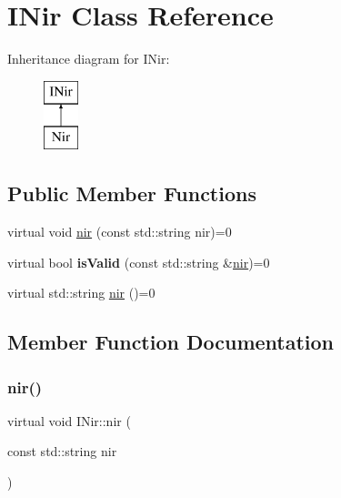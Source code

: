 \hypertarget{class_i_nir}{}\section{I\+Nir Class Reference}
\label{class_i_nir}
Inheritance diagram for I\+Nir\+:\begin{figure}[H]
\begin{center}
\leavevmode
\includegraphics[height=2.000000cm]{class_i_nir}
\end{center}
\end{figure}
\subsection*{Public Member Functions}
\begin{DoxyCompactItemize}
\item 
virtual void \mbox{\hyperlink{class_i_nir_a85dc40ecca7cfca5546664c12d224d97}{nir}} (const std\+::string nir)=0
\item 
\mbox{\label{class_i_nir_a117022e2afe59d0250236d99116be834}} 
virtual bool {\bfseries is\+Valid} (const std\+::string \&\mbox{\hyperlink{class_i_nir_a85dc40ecca7cfca5546664c12d224d97}{nir}})=0
\item 
virtual std\+::string \mbox{\hyperlink{class_i_nir_a15730cebcb93aaf847aa46ce976b6557}{nir}} ()=0
\end{DoxyCompactItemize}


\subsection{Member Function Documentation}
\mbox{\label{class_i_nir_a85dc40ecca7cfca5546664c12d224d97}} 
\subsubsection{\texorpdfstring{nir()}{nir()}\hspace{0.1cm}{\footnotesize\ttfamily [1/2]}}
{\footnotesize\ttfamily virtual void I\+Nir\+::nir (\begin{DoxyParamCaption}\item[{const std\+::string}]{nir }\end{DoxyParamCaption})\hspace{0.3cm}{\ttfamily [pure virtual]}}

